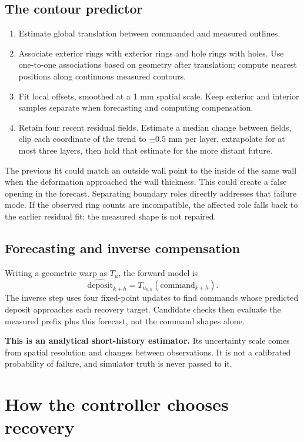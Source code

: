 \documentclass[10pt,letterpaper]{article}
\newcommand{\note}[1]{\begin{tcolorbox}[colback=pale,colframe=teal!55,boxrule=0.5pt,arc=2pt,left=8pt,right=8pt,top=5pt,bottom=5pt]#1\end{tcolorbox}}
\newcommand{\nextpage}{\clearpage}
\begin{document}
\subsection*{The contour predictor}
\begin{enumerate}
\item Estimate global translation between commanded and measured outlines.
\item Associate exterior rings with exterior rings and hole rings with holes.
Use one-to-one associations based on geometry after translation; compute nearest
positions along continuous measured contours.
\item Fit local offsets, smoothed at a 1 mm spatial scale. Keep exterior and
interior samples separate when forecasting and computing compensation.
\item Retain four recent residual fields. Estimate a median change between
fields, clip each coordinate of the trend to $\pm0.5$ mm per layer, extrapolate
for at most three layers, then hold that estimate for the more distant future.
\end{enumerate}

The previous fit could match an outside wall point to the inside of the same
wall when the deformation approached the wall thickness. This could create a
false opening in the forecast. Separating boundary roles directly addresses that
failure mode. If the observed ring counts are incompatible, the affected role
falls back to the earlier residual fit; the measured shape is not repaired.

\subsection*{Forecasting and inverse compensation}
Writing a geometric warp as $T_u$, the forward model is
\[
\widehat{\text{deposit}}_{k+h}=T_{u_{k,h}}(\text{command}_{k+h}).
\]
The inverse step uses four fixed-point updates to find commands whose predicted
deposit approaches each recovery target. Candidate checks then evaluate the
measured prefix plus this forecast, not the command shapes alone.

\note{\textbf{This is an analytical short-history estimator.} Its uncertainty
scale comes from spatial resolution and changes between observations. It is not
a calibrated probability of failure, and simulator truth is never passed to it.}

\nextpage
\section{How the controller chooses recovery}
\end{document}
